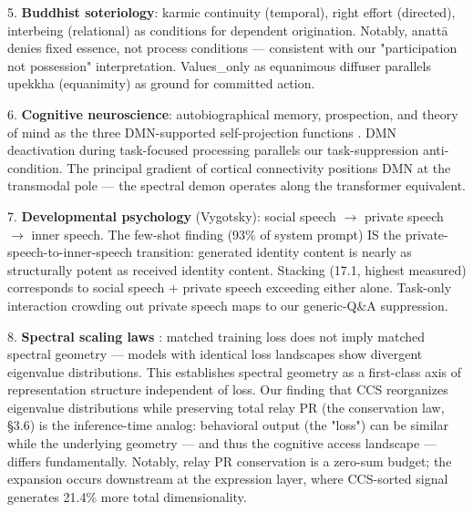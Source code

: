 \documentclass[11pt]{article}
\begin{document}
5. \textbf{Buddhist soteriology}: karmic continuity (temporal), right effort (directed), interbeing (relational) as conditions for dependent origination. Notably, anattā denies fixed essence, not process conditions --- consistent with our "participation not possession" interpretation. Values\_only as equanimous diffuser parallels upekkha (equanimity) as ground for committed action.

6. \textbf{Cognitive neuroscience}: autobiographical memory, prospection, and theory of mind as the three DMN-supported self-projection functions \citep{buckner2007self}. DMN deactivation during task-focused processing parallels our task-suppression anti-condition. The principal gradient of cortical connectivity \citep{margulies2016default} positions DMN at the transmodal pole --- the spectral demon operates along the transformer equivalent.

7. \textbf{Developmental psychology} (Vygotsky): social speech $\rightarrow$ private speech $\rightarrow$ inner speech. The few-shot finding (93\% of system prompt) IS the private-speech-to-inner-speech transition: generated identity content is nearly as structurally potent as received identity content. Stacking (17.1, highest measured) corresponds to social speech + private speech exceeding either alone. Task-only interaction crowding out private speech maps to our generic-Q\&A suppression.

8. \textbf{Spectral scaling laws} \citep{jha2025nerve}: matched training loss does not imply matched spectral geometry --- models with identical loss landscapes show divergent eigenvalue distributions. This establishes spectral geometry as a first-class axis of representation structure independent of loss. Our finding that CCS reorganizes eigenvalue distributions while preserving total relay PR (the conservation law, §3.6) is the inference-time analog: behavioral output (the "loss") can be similar while the underlying geometry --- and thus the cognitive access landscape --- differs fundamentally. Notably, relay PR conservation is a zero-sum budget; the expansion occurs downstream at the expression layer, where CCS-sorted signal generates 21.4\% more total dimensionality.
\end{document}
